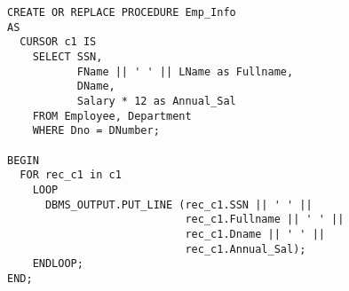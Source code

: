 
\begin{verbatim}
CREATE OR REPLACE PROCEDURE Emp_Info
AS
  CURSOR c1 IS
    SELECT SSN,
           FName || ' ' || LName as Fullname,
           DName,
           Salary * 12 as Annual_Sal
    FROM Employee, Department
    WHERE Dno = DNumber;

BEGIN
  FOR rec_c1 in c1
    LOOP
      DBMS_OUTPUT.PUT_LINE (rec_c1.SSN || ' ' ||
                            rec_c1.Fullname || ' ' ||
                            rec_c1.Dname || ' ' ||
                            rec_c1.Annual_Sal);
    ENDLOOP;
END;
\end{verbatim}

